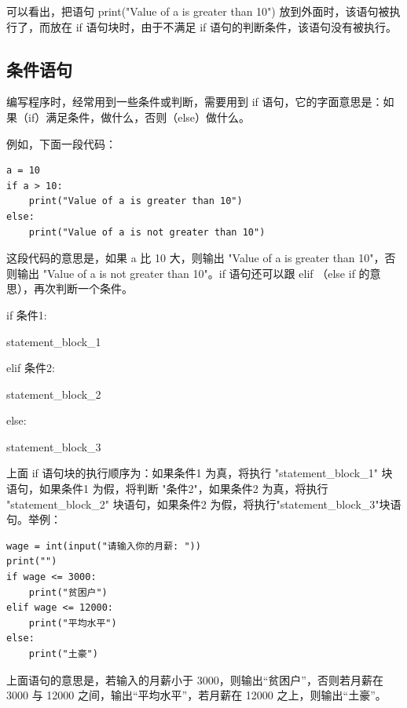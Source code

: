 可以看出，把语句 print("Value of a is greater than 10") 放到外面时，该语句被执行了，而放在 if 语句块时，由于不满足 if 语句的判断条件，该语句没有被执行。

\subsection{条件语句}

编写程序时，经常用到一些条件或判断，需要用到 if 语句，它的字面意思是：如果（if）满足条件，做什么，否则（else）做什么。

例如，下面一段代码：

\begin{lstlisting}[Language=Python]
a = 10
if a > 10:
    print("Value of a is greater than 10")
else:
    print("Value of a is not greater than 10")
\end{lstlisting}

这段代码的意思是，如果 a 比 10 大，则输出 "Value of a is greater than 10"，否则输出 "Value of a is not greater than 10"。if 语句还可以跟 elif （else if 的意思），再次判断一个条件。

\begin{center}
\begin{tcolorbox} [title = if 语句的一般模式]
  \bf
  \begin{tcboutputlisting}
    if 条件1:

        \quad statement\_block\_1

    elif 条件2:

        \quad statement\_block\_2

    else:

        \quad statement\_block\_3
\end{tcboutputlisting}
\end{tcolorbox}
\end{center}


上面 if 语句块的执行顺序为：如果条件1 为真，将执行 "statement\_block\_1" 块语句，如果条件1 为假，将判断 "条件2"，如果条件2 为真，将执行 "statement\_block\_2" 块语句，如果条件2 为假，将执行"statement\_block\_3"块语句。举例：

\begin{lstlisting}[Language=Python]
wage = int(input("请输入你的月薪: "))
print("")
if wage <= 3000:
    print("贫困户")
elif wage <= 12000:
    print("平均水平")
else:
    print("土豪")
\end{lstlisting}

上面语句的意思是，若输入的月薪小于 3000，则输出“贫困户”，否则若月薪在 3000 与 12000 之间，输出“平均水平”，若月薪在 12000 之上，则输出“土豪”。

